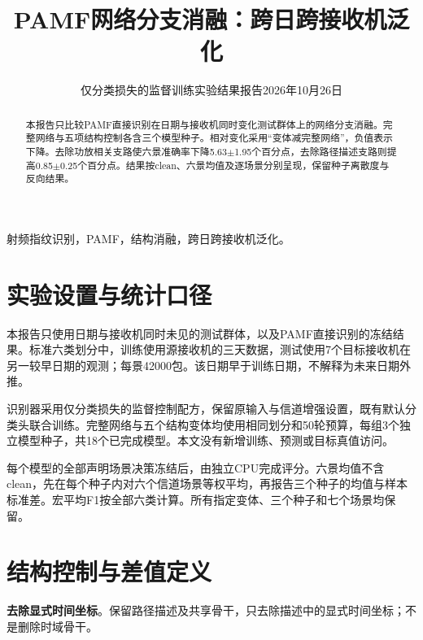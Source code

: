 \documentclass[10pt,journal]{IEEEtran}
\begin{document}
\title{PAMF网络分支消融：跨日跨接收机泛化}

\author{仅分类损失的监督训练\quad 实验结果报告\quad 2026年10月26日}

\maketitle

\begin{abstract}

本报告只比较PAMF直接识别在日期与接收机同时变化测试群体上的网络分支消融。完整网络与五项结构控制各含三个模型种子。相对变化采用“变体减完整网络”，负值表示下降。去除功放相关支路使六景准确率下降5.63\ensuremath{\pm}1.95个百分点，去除路径描述支路则提高0.85\ensuremath{\pm}0.25个百分点。结果按clean、六景均值及逐场景分别呈现，保留种子离散度与反向结果。

\end{abstract}

\begin{IEEEkeywords}射频指纹识别，PAMF，结构消融，跨日跨接收机泛化。\end{IEEEkeywords}

\section{实验设置与统计口径}

本报告只使用日期与接收机同时未见的测试群体，以及PAMF直接识别的冻结结果。标准六类划分中，训练使用源接收机的三天数据，测试使用7个目标接收机在另一较早日期的观测；每景42000包。该日期早于训练日期，不解释为未来日期外推。

识别器采用仅分类损失的监督控制配方，保留原输入与信道增强设置，既有默认分类头联合训练。完整网络与五个结构变体均使用相同划分和50轮预算，每组3个独立模型种子，共18个已完成模型。本文没有新增训练、预测或目标真值访问。

每个模型的全部声明场景决策冻结后，由独立CPU完成评分。六景均值不含clean，先在每个种子内对六个信道场景等权平均，再报告三个种子的均值与样本标准差。宏平均F1按全部六类计算。所有指定变体、三个种子和七个场景均保留。

\section{结构控制与差值定义}

\noindent\textbf{去除显式时间坐标}。保留路径描述及共享骨干，只去除描述中的显式时间坐标；不是删除时域骨干。\par
\end{document}
